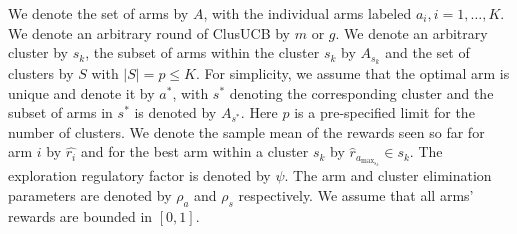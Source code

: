 We denote the set of arms by $A$, with the individual arms labeled $a_i, i=1,\ldots,K$.
We denote an arbitrary round of ClusUCB by $m$ or $g$. We denote an arbitrary cluster by $s_{k}$, the subset of arms within the cluster $s_k$ by  $A_{s_{k}}$  and the set of clusters by $S$ with $|S|=p\leq K$. For simplicity, we assume that the optimal arm is unique and denote it by $a^{*}$, with $s^{*}$ denoting the corresponding cluster and the subset of arms in $s^{*}$ is denoted by $A_{s^{*}}$. Here $p$ is a pre-specified limit for the number of clusters. 
We denote the sample mean of the rewards seen so far for arm $i$ by $\hat{r_i}$ and for the best arm within a cluster $s_k$ by $\hat{r}_{a_{\max_{s_{k}}}}\in s_{k}$. The exploration regulatory factor is denoted by $\psi$. The arm and cluster elimination parameters are denoted by $\rho_{a}$ and $\rho_{s}$ respectively.
We assume that all arms' rewards are bounded in $[0,1]$.


